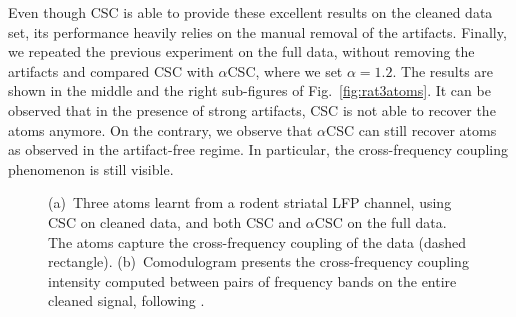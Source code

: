 Even though CSC is able to provide these excellent results on the cleaned data set, its performance heavily relies on the manual removal of the artifacts. Finally, we repeated the previous experiment on the full data, without removing the artifacts and compared CSC with $\alpha$CSC, where we set $\alpha=1.2$. The results are shown in the middle and the right sub-figures of Fig.~\ref{fig:rat3atoms}. It can be observed that in the presence of strong artifacts, CSC is not able to recover the atoms anymore. On the contrary, we observe that $\alpha$CSC can still recover atoms as observed in the artifact-free regime. In particular, the cross-frequency coupling phenomenon is still visible.


\begin{figure}[t]
    \centering
    \vspace{-10pt}
    \caption[Three atoms learnt from a rodent striatal LFP channel, using CSC on cleaned data, and both CSC and $\alpha$CSC on the full data.]{(a)~Three atoms learnt from a rodent striatal LFP channel, using CSC on cleaned data, and both CSC and $\alpha$CSC on the full data. The atoms capture the cross-frequency coupling of the data (dashed rectangle). (b)~Comodulogram presents the cross-frequency coupling intensity computed between pairs of frequency bands on the entire cleaned signal, following \cite{tort2010measuring}.}
    \label{fig:ratdata}
    \vspace{-10pt}
\end{figure}




